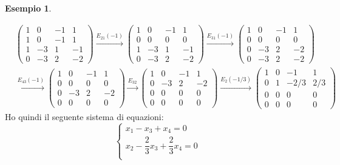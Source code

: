 \documentclass[a4paper]{article}
\theoremstyle{definition}
\newtheorem{exmp}{Esempio}[section]
\begin{document}
\begin{exmp}
\begin{enumerate}
					\begin{align*}
						&\begin{pmatrix}
							1 & 0 & -1 & 1 \\
							1 & 0 & -1 & 1 \\
							1 & -3 & 1 & -1 \\
							0 & -3 & 2 & -2
						\end{pmatrix}
						\xrightarrow{E_{2 1}(-1)}
						\begin{pmatrix}
							1 & 0 & -1 & 1 \\
							0 & 0 & 0 & 0 \\
							1 & -3 & 1 & -1 \\
							0 & -3 & 2 & -2
						\end{pmatrix}
						\xrightarrow{E_{3 1}(-1)}
						\begin{pmatrix}
							1 & 0 & -1 & 1 \\
							0 & 0 & 0 & 0 \\
							0 & -3 & 2 & -2 \\
							0 & -3 & 2 & -2
						\end{pmatrix} \\
						&\xrightarrow{E_{4 3}(-1)}
						\begin{pmatrix}
							1 & 0 & -1 & 1 \\
							0 & 0 & 0 & 0 \\
							0 & -3 & 2 & -2 \\
							0 & 0 & 0 & 0
						\end{pmatrix}
						\xrightarrow{E_{3 2}}
						\begin{pmatrix}
							1 & 0 & -1 & 1 \\
							0 & -3 & 2 & -2 \\
							0 & 0 & 0 & 0 \\
							0 & 0 & 0 & 0
						\end{pmatrix}
						\xrightarrow{E_{2}(-1/3)}
						\begin{pmatrix}
							1 & 0 & -1 & 1 \\
							0 & 1 & -2/3 & 2/3 \\
							0 & 0 & 0 & 0 \\
							0 & 0 & 0 & 0
						\end{pmatrix}
					\end{align*}
					Ho quindi il seguente sistema di equazioni:
					\[
						\begin{cases*}
							x_1 - x_3 + x_4 = 0 \\
							x_2 - \dfrac{2}{3}x_3 + \dfrac{2}{3}x_4 = 0 \\

\end{cases*}\]
\end{enumerate}
\end{exmp}
\end{document}
